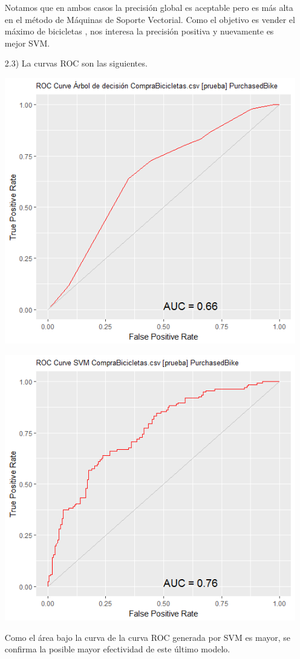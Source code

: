 \documentclass[11pt,a4paper]{report}
\begin{document}
\begin{itemize}
Notamos que en ambos casos la precisión global es aceptable pero es más alta en el método de Máquinas de Soporte Vectorial. Como el objetivo es vender el máximo de  bicicletas , nos interesa   la precisión positiva y nuevamente es mejor SVM.
\item[2.3)] La curvas ROC son las siguientes.
\begin{center}
\includegraphics[scale=0.6]{ROCarbolrattle.png}
\end{center}\begin{center}
\includegraphics[scale=0.6]{ROCsvmrattle.png}
\end{center}
Como el área bajo la curva de la curva ROC generada por SVM es mayor, se confirma la  posible mayor efectividad de este último modelo.

\end{itemize}
\end{document}
